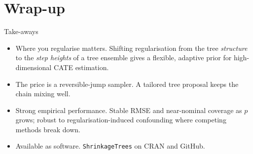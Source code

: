 \documentclass[10pt,aspectratio=169]{beamer}
\begin{document}
\section{Wrap-up}

\begin{frame}{Take-aways}
\begin{itemize}
  \item \alert{Where you regularise matters.} Shifting regularisation from the tree \emph{structure} to the \emph{step heights} of a tree ensemble gives a flexible, adaptive prior for high-dimensional CATE estimation.
  \vspace{0.3cm}
  \item \alert{The price is a reversible-jump sampler.} A tailored tree proposal keeps the chain mixing well.
  \vspace{0.3cm}
  \item \alert{Strong empirical performance.} Stable RMSE and near-nominal coverage as $p$ grows; robust to regularisation-induced confounding where competing methods break down.
  \vspace{0.3cm}
  \item \alert{Available as software.} \texttt{ShrinkageTrees} on CRAN and GitHub.
\end{itemize}
\end{frame}
\end{document}
